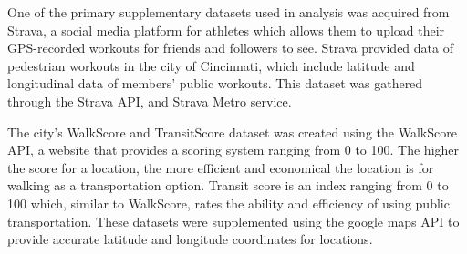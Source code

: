 \documentclass{llncs}
\begin{document}
One of the primary supplementary datasets used in analysis was acquired from Strava, a social media platform for athletes which allows them to upload their GPS-recorded workouts for friends and followers to see. Strava provided data of pedestrian workouts in the city of Cincinnati, which include latitude and longitudinal data of members' public workouts. This dataset was gathered through the Strava API, and Strava Metro service.

The city's WalkScore and TransitScore dataset was created using the WalkScore API, a website that provides a scoring system ranging from 0 to 100. The higher the score for a location, the more efficient and economical the location is for walking as a transportation option. Transit score is an index ranging from 0 to 100 which, similar to WalkScore, rates the ability and efficiency of using public transportation. These datasets were supplemented using the google maps API to provide accurate latitude and longitude coordinates for locations.
\end{document}
